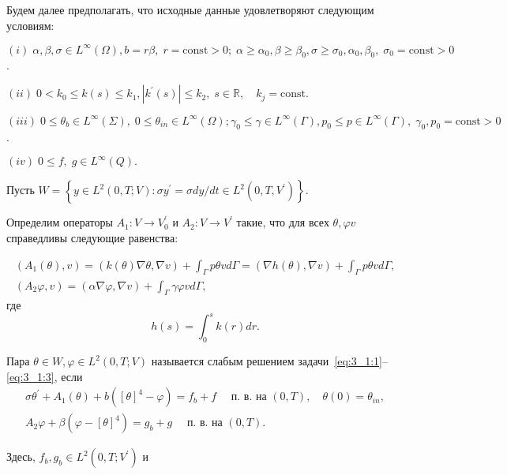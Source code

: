 Будем далее предполагать, что исходные данные удовлетворяют следующим условиям:

$(i)\;\alpha, \beta, \sigma \in L^{\infty}(\Omega), b=r \beta,\; r= \text{const} >0;\;
\alpha \geq \alpha_{0}, \beta \geq \beta_{0},
\sigma \geq \sigma_{0}, \alpha_{0}, \beta_{0},\; \sigma_{0}=\text{const}>0$.

$(ii)\;0<k_{0} \leq k(s) \leq k_{1},\left|k^{\prime}(s)\right| \leq k_{2},\; s \in \mathbb{R},
\quad k_{j} = \text{const}.$

$(iii)\; 0 \leq \theta_{b} \in L^{\infty}(\Sigma),\; 0 \leq \theta_{i n} \in L^{\infty}(\Omega);
\gamma_{0} \leq \gamma \in L^{\infty}(\Gamma),
p_{0} \leq p \in L^{\infty}(\Gamma),\; \gamma_{0}, p_{0}= \text{const} >0$.

$(iv)\; 0 \leq f,\; g \in L^{\infty}(Q).$

Пусть
$
W=\left\{y \in L^{2}(0, T ; V): \sigma y^{\prime}=\sigma d y / d t
\in L^{2}\left(0, T, V^{\prime}\right)\right\}.
$

Определим операторы $A_{1}: V \rightarrow V_{0}^{\prime}$ и $A_{2}: V \rightarrow V^{\prime}$ такие,
что для всех $\theta, \varphi v$ справедливы следующие равенства:

\[
    \begin{gathered}
        \left(A_{1}(\theta), v\right)=(k(\theta) \nabla \theta, \nabla v)
        +\int_{\Gamma} p \theta v d \Gamma=(\nabla h(\theta), \nabla v)+\int_{\Gamma} p \theta v d \Gamma, \\
        \left(A_{2} \varphi, v\right)=(\alpha \nabla \varphi, \nabla v)
        +\int_{\Gamma} \gamma \varphi v d \Gamma,
    \end{gathered}
\]
где
\[ h(s)=\int_{0}^{s} k(r) d r. \]

\begin{definition}
    Пара $\theta \in W, \varphi \in L^{2}(0, T ; V)$ называется слабым решением
    задачи~\eqref{eq:3_1:1}--\eqref{eq:3_1:3}, если
    \begin{gather}
        \sigma \theta^{\prime}+A_{1}(\theta)
        +b\left([\theta]^{4}-\varphi\right)=f_{b}+f
        \quad \text { п. в. на }(0, T),
        \quad \theta(0)=\theta_{i n}, \label{eq:3_1:4}\\
        A_{2} \varphi+\beta\left(\varphi-[\theta]^{4}\right)=
        g_{b}+g \quad \text { п. в. на }(0, T). \label{eq:3_1:5}
    \end{gather}
\end{definition}

Здесь, $f_{b}, g_{b} \in L^{2}\left(0, T ; V^{\prime}\right)$ и

